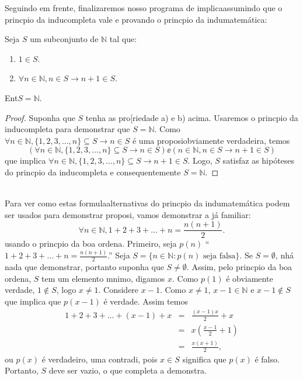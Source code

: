 Seguindo em frente, finalizaremos nosso programa de implica\coes assumindo que o princ\ih pio da indu\cao completa vale e provando o princ\ih pio da indu\cao matem\'atica:
\begin{teob}\label{indteo3}
Seja $S$ um subconjunto de $\mathbb{N}$ tal que:
\begin{enumerate}[{\bf a)}]
\item $1\in S$.
\item $\forall n\in \mathbb{N}, n\in S \rightarrow n+1\in S$. 
\end{enumerate}
Ent\ao $S=\mathbb{N}$. 
\end{teob}
\begin{proof}
Suponha que $S$ tenha as pro[riedade a) e b) acima. Usaremos o princ\ih pio da indu\cao completa para demonstrar que $S=\mathbb{N}$. Como $\forall n \in\mathbb{N}, \{1,2,3,...,n\}\subseteq S \rightarrow n\in S$ \'e uma proposi\cao obviamente verdadeira, temos
\[
(\forall n \in\mathbb{N}, \{1,2,3,...,n\}\subseteq S \rightarrow n\in S)\ee(n\in \mathbb{N}, n\in S \rightarrow n+1\in S)
\] 
que implica $\forall n \in\mathbb{N}, \{1,2,3,...,n\}\subseteq S \rightarrow n+1\in S$. Logo, $S$ satisfaz as hip\'oteses do princ\ih pio da indu\cao completa e consequentemente $S=\mathbb{N}$.
\end{proof}
\\


Para ver como estas formula\coes alternativas do princ\ih pio da indu\cao matem\'atica podem ser usados para demonstrar proposi\cois, vamos demonstrar a j\'a familiar:
\[
\forall n\in\mathbb{N}, 1+2+3+...+n=\frac{n(n+1)}{2}.
\]
usando o princ\ih pio da boa ordena\caoi. Primeiro, seja $p(n)$ ``$1+2+3+...+n=\frac{n(n+1)}{2}$.'' Seja $S=\{n\in\mathbb{N}: p(n) \textrm{ seja falsa}\}$. Se $S=\emptyset$, n\ao h\'a nada que demonstrar, portanto suponha que $S\neq\emptyset$. Assim, pelo princ\ih pio da boa ordena\caoi, $S$ tem um elemento m\ih nimo, digamos $x$. Como $p(1)$ \'e obviamente verdade, $1\notin S$, logo $x\neq 1$. Considere $x-1$. Como $x\neq 1$, $x-1\in\mathbb{N}$ e $x-1\notin S$ que implica que $p(x-1)$ \'e verdade. Assim temos
\begin{eqnarray*}
1+2+3+...+(x-1)+x &=& \frac{(x-1)x}{2}+x\\
                  &=& x\left(\frac{x-1}{2}+1\right) \\
                  &=& \frac{x(x+1)}{2},
\end{eqnarray*} 
ou $p(x)$ \'e verdadeiro, uma contradi\caoi, pois $x\in S$ significa que $p(x)$ \'e falso. Portanto, $S$ deve ser vazio, o que completa a demonstra\caoi.

